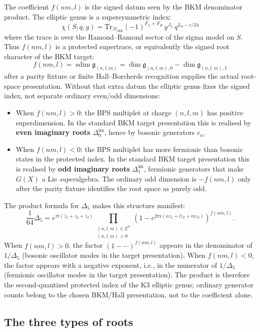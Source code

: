 \documentclass[11pt]{article}
\theoremstyle{definition}
\newcommand{\Tr}{\mathrm{Tr}}
\newcommand{\bZ}{\mathbb{Z}}
\begin{document}
The coefficient $f(nm,l)$ is the signed datum seen by the BKM
denominator product. The elliptic genus is a supersymmetric index:
\[
 \chi(S; q, y) = \Tr_{\mathcal{H}_{\mathrm{RR}}}
 (-1)^{F_L + F_R} \, y^{J_L} \, q^{L_0 - c/24}
\]
where the trace is over the Ramond--Ramond sector of the
sigma model on $S$. Thus $f(nm,l)$ is a protected supertrace, or
equivalently the signed root character of the BKM target:
\[
 f(nm,l)
 =
 \operatorname{sdim} \mathfrak{g}_{(n,l,m)}
 =
 \dim \mathfrak{g}_{(n,l,m),0}
 -
 \dim \mathfrak{g}_{(n,l,m),1}
\]
after a parity fixture or finite Hall--Borcherds recognition supplies
the actual root-space presentation. Without that extra datum the
elliptic genus fixes the signed index, not separate ordinary
even/odd dimensions:
\begin{itemize}
 \item When $f(nm, l) > 0$: the BPS multiplet at charge $(n,l,m)$
 has positive superdimension. In the standard BKM target presentation
 this is realised by \textbf{even imaginary roots}
 $\Delta^{\mathrm{im}}_0$, hence by bosonic generators $e_\alpha$.

 \item When $f(nm, l) < 0$: the BPS multiplet has more fermionic
 than bosonic states in the protected index. In the standard BKM
 target presentation this is realised by \textbf{odd imaginary roots}
 $\Delta^{\mathrm{im}}_1$, fermionic generators that make $G(X)$
 a Lie \emph{super}algebra. The ordinary odd dimension is
 $-f(nm,l)$ only after the parity fixture identifies the root space as
 purely odd.
\end{itemize}

The product formula for $\Delta_5$ makes this structure manifest:
\[
 \frac{1}{64} \Delta_5
 = e^{\pi i(z_1 + z_2 + z_3)}
 \prod_{\substack{(n,l,m) \in \bZ^3 \\ (n,l,m) > 0}}
 (1 - e^{2\pi i(nz_1 + lz_2 + mz_3)})^{f(nm,l)}.
\]
When $f(nm,l) > 0$, the factor $(1 - \cdots)^{f(nm,l)}$ appears in
the denominator of $1/\Delta_5$ (bosonic oscillator modes in the
target presentation). When $f(nm,l) < 0$, the factor appears with a
negative exponent, i.e., in the numerator of $1/\Delta_5$ (fermionic
oscillator modes in the target presentation). The product is therefore
the second-quantized protected index of the K3 elliptic genus; ordinary
generator counts belong to the chosen BKM/Hall presentation, not to
the coefficient alone.

\subsection{The three types of roots}
\end{document}
